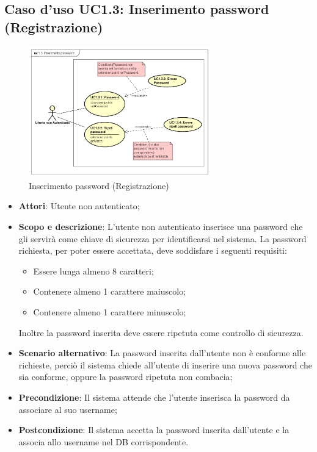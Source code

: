 \documentclass[12pt,a4paper,titlepage]{article}
\begin{document}
	\subsection{Caso d'uso UC1.3: Inserimento password (Registrazione)}
	\label{UC1.3}
	\begin{figure}[H]
		\centering
		\includegraphics[width=0.7\textwidth]{UseCase/InserimentoPassword}
		\caption{Inserimento password (Registrazione)}
	\end{figure}
	\begin{itemize}
		\item \textbf{Attori}: Utente non autenticato;
		\item \textbf{Scopo e descrizione}: L'utente non autenticato inserisce una password che gli servirà come chiave di sicurezza per identificarsi nel sistema. La password richiesta, per poter essere accettata, deve soddisfare i seguenti requisiti: 
		\begin{itemize}
			\item Essere lunga almeno 8 caratteri; 
			\item Contenere almeno 1 carattere maiuscolo; 
			\item Contenere almeno 1 carattere minuscolo;
		\end{itemize}
		Inoltre la password inserita deve essere ripetuta come controllo di sicurezza.
		\item \textbf{Scenario alternativo}: La password inserita dall'utente non è conforme alle richieste, perciò il sistema chiede all'utente di inserire una nuova password che sia conforme, oppure la password ripetuta non combacia;
		\item \textbf{Precondizione}: Il sistema attende che l'utente inserisca la password da associare al suo username;
		\item \textbf{Postcondizione}: Il sistema accetta la password inserita dall'utente e la associa allo username nel DB corrispondente.
	\end{itemize}
\end{document}
